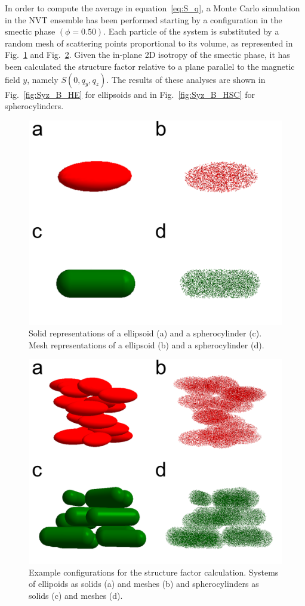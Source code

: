 \documentclass[aip,graphicx]{revtex4-1} %
\begin{document}
In order to compute the average in equation~\ref{eq:S_q}, a Monte Carlo simulation in the NVT ensemble has been performed starting by a configuration in the smectic phase $(\phi = 0.50)$. 
Each particle of the system is substituted by a random mesh of scattering points proportional to its volume, as represented in Fig.~\ref{fig:scatt_mod_single} and Fig.~\ref{fig:scatt_mod1}. 
Given the in-plane 2D isotropy of the smectic phase, it has been calculated the structure factor relative to a plane parallel to the magnetic field $y$, namely $S(0, q_y, q_z)$. The results of these analyses are shown in Fig.~\ref{fig:Syz_B_HE} for ellipsoids and in Fig.~\ref{fig:Syz_B_HSC} for spherocylinders.

\begin{figure}
    \centering
    \includegraphics[width=0.5\columnwidth]{Scatteringmodel_single.png}
    \caption{Solid representations of a ellipsoid (a) and a spherocylinder (c). Mesh representations of a ellipsoid (b) and a spherocylinder (d).}\label{fig:scatt_mod_single}
\end{figure}

\begin{figure}
    \centering
    \includegraphics[width=0.5\columnwidth]{Scatteringmodel1.png}
    \caption{Example configurations for the structure factor calculation. Systems of ellipoids as solids (a) and meshes (b) and spherocylinders as solids (c) and meshes (d).}\label{fig:scatt_mod1}
\end{figure}
\end{document}
